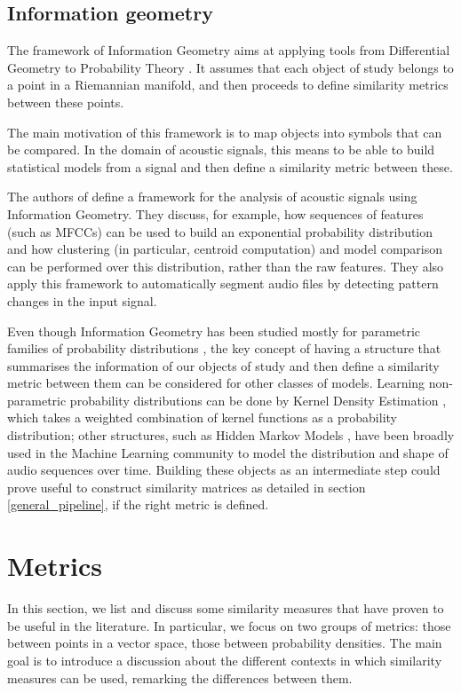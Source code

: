 \documentclass[../main.tex]{subfiles} \label{chapter_soa}
\begin{document}
\subsection{Information geometry} \label{subsection_infgeom}
The framework of Information Geometry aims at applying tools from Differential Geometry to Probability Theory \cite{Wang2009}. It assumes that each object of study belongs to a point in a Riemannian manifold, and then proceeds to define similarity metrics between these points.
\par The main motivation of this framework is to map objects into symbols that can be compared. In the domain of acoustic signals, this means to be able to build statistical models from a signal and then define a similarity metric between these.
\par The authors of \cite{Cont2011} define a framework for the analysis of acoustic signals using Information Geometry. They discuss, for example, how sequences of features (such as MFCCs) can be used to build an exponential probability distribution and how clustering (in particular, centroid computation) and model comparison can be performed over this distribution, rather than the raw features. They also apply this framework to automatically segment audio files by detecting pattern changes in the input signal.
\par Even though Information Geometry has been studied mostly for parametric families of probability distributions \cite{Amari2001}, the key concept of having a structure that summarises the information of our objects of study and then define a similarity metric between them can be considered for other classes of models. Learning non-parametric probability distributions can be done by Kernel Density Estimation \cite{Goodall2008}, which takes a weighted combination of kernel functions as a probability distribution; other structures, such as Hidden Markov Models \cite{Chou2008,Muda2010,Hsieh2009,Wielgat2012}, have been broadly used in the Machine Learning community to model the distribution and shape of audio sequences over time. Building these objects as an intermediate step could prove useful to construct similarity matrices as detailed in section \ref{general_pipeline}, if the right metric is defined.

\section{Metrics}\label{metrics_review}
In this section, we list and discuss some similarity measures that have proven to be useful in the literature. In particular, we focus on two groups of metrics: those between points in a vector space, those between probability densities. The main goal is to introduce a discussion about the different contexts in which similarity measures can be used, remarking the differences between them.
\end{document}
